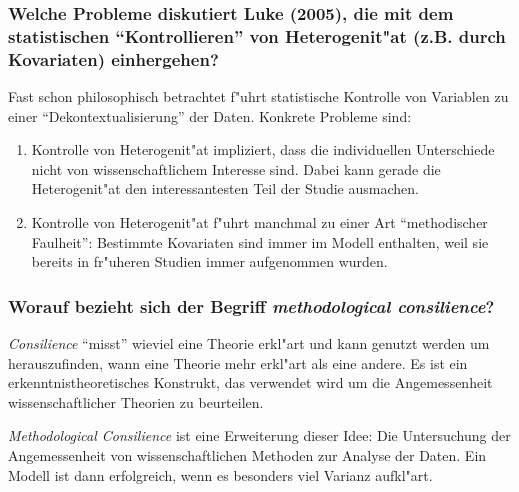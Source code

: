 \subsubsection{Welche Probleme diskutiert Luke (2005), die mit dem statistischen ``Kontrollieren'' von Heterogenit"at (z.B. durch Kovariaten) einhergehen?}
Fast schon philosophisch betrachtet f"uhrt statistische Kontrolle von Variablen zu einer ``Dekontextualisierung'' der Daten. Konkrete Probleme sind:
\begin{enumerate}
  \item Kontrolle von Heterogenit"at impliziert, dass die individuellen Unterschiede nicht von wissenschaftlichem Interesse sind. Dabei kann gerade die Heterogenit"at den interessantesten Teil der Studie ausmachen.
  \item Kontrolle von Heterogenit"at f"uhrt manchmal zu einer Art ``methodischer Faulheit'': Bestimmte Kovariaten sind immer im Modell enthalten, weil sie bereits in fr"uheren Studien immer aufgenommen wurden.
\end{enumerate}

\subsubsection{Worauf bezieht sich der Begriff  \emph{methodological consilience}?}
\emph{Consilience} ``misst'' wieviel eine Theorie erkl"art und kann genutzt werden um herauszufinden, wann eine Theorie mehr erkl"art als eine andere. Es ist ein erkenntnistheoretisches Konstrukt, das verwendet wird um die Angemessenheit wissenschaftlicher Theorien zu beurteilen.

\emph{Methodological Consilience} ist eine Erweiterung dieser Idee: Die Untersuchung der Angemessenheit von wissenschaftlichen Methoden zur Analyse der Daten. Ein Modell ist dann erfolgreich, wenn es besonders viel Varianz aufkl"art.
